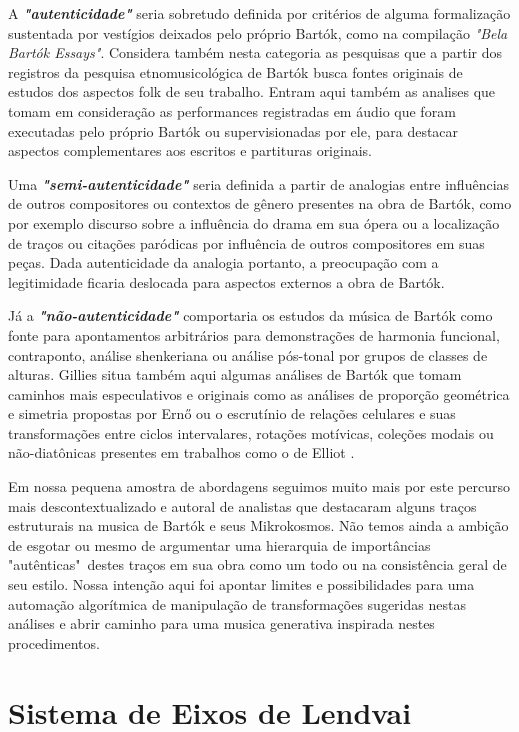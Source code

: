 \documentclass[
	12pt,				%
	openright,			%
	twoside,			%
	a4paper,			%
	english,			%
	french,				%
	spanish,			%
	brazil				%
	]{abntex2}
\begin{document}
\pagebreak
A \textit{\textbf{"autenticidade"}} seria sobretudo definida por critérios de alguma formalização sustentada por vestígios deixados pelo próprio Bartók, como na compilação \textit{"Bela Bartók Essays"}\cite{bartok1993bela}. Considera também nesta categoria as pesquisas que a partir dos registros da pesquisa etnomusicológica de Bartók busca fontes originais de estudos dos aspectos folk de seu trabalho. Entram aqui também as analises que tomam em consideração as performances registradas em áudio que foram executadas pelo próprio Bartók ou supervisionadas por ele, para destacar aspectos complementares aos escritos e partituras originais. 

Uma \textit{\textbf{"semi-autenticidade"}} seria definida a partir de analogias entre influências de outros compositores ou contextos de gênero presentes na obra de Bartók, como por exemplo discurso sobre a influência do drama em sua ópera ou a localização de traços ou citações paródicas por influência de outros compositores em suas peças. Dada autenticidade da analogia portanto, a preocupação com a legitimidade ficaria deslocada para aspectos externos a obra de Bartók.

Já a \textit{\textbf{"não-autenticidade"}} comportaria os estudos da música de Bartók como fonte para apontamentos arbitrários para demonstrações de harmonia funcional, contraponto, análise shenkeriana ou análise pós-tonal por grupos de classes de alturas. Gillies situa também aqui algumas análises de Bartók que tomam caminhos mais especulativos e originais como as análises de proporção geométrica e simetria propostas por Ern{\H{o}}   ou o escrutínio de relações celulares e suas transformações entre ciclos intervalares, rotações motívicas, coleções modais ou não-diatônicas presentes em trabalhos como o de Elliot . 

Em nossa pequena amostra de abordagens seguimos muito mais por este percurso mais descontextualizado e autoral de analistas que destacaram alguns traços estruturais na musica de Bartók e seus Mikrokosmos. Não temos ainda a ambição de esgotar ou mesmo de argumentar uma hierarquia de importâncias "autênticas"\ destes traços em sua obra como um todo ou na consistência geral de seu estilo. Nossa intenção aqui foi apontar limites e possibilidades para uma automação algorítmica de manipulação de transformações sugeridas nestas análises e abrir caminho para uma musica generativa inspirada nestes procedimentos.

\section{Sistema de Eixos de Lendvai}
\end{document}

